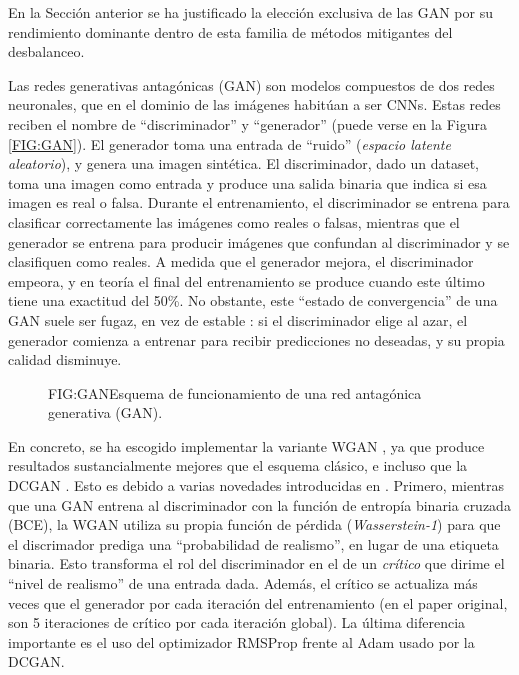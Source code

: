 En la Sección anterior se ha justificado la elección exclusiva de las GAN por su rendimiento dominante dentro de esta familia de métodos mitigantes del desbalanceo.


Las redes generativas antagónicas (GAN) son modelos compuestos de dos redes neuronales, que en el dominio de las imágenes habitúan a ser CNNs. Estas redes reciben el nombre de ``discriminador'' y ``generador'' (puede verse en la Figura \ref{FIG:GAN}). El generador toma una entrada de ``ruido'' (\textit{espacio latente aleatorio}), y genera una imagen sintética. El discriminador, dado un dataset, toma una imagen como entrada y produce una salida binaria que indica si esa imagen es real o falsa. Durante el entrenamiento, el discriminador se entrena para clasificar correctamente las imágenes como reales o falsas, mientras que el generador se entrena para producir imágenes que confundan al discriminador y se clasifiquen como reales. A medida que el generador mejora, el discriminador empeora, y en teoría el final del entrenamiento se produce cuando este último tiene una exactitud del 50\%. No obstante, este ``estado de convergencia'' de una GAN suele ser fugaz, en vez de estable \cite{GoogleGAN}: si el discriminador elige al azar, el generador comienza a entrenar para recibir predicciones no deseadas, y su propia calidad disminuye.

\begin{figure}[Esquema de la GAN]{FIG:GAN}{Esquema de funcionamiento de una red antagónica generativa (GAN).}
\end{figure}

En concreto, se ha escogido implementar la variante WGAN \cite{arjovsky2017wasserstein}, ya que produce resultados sustancialmente mejores que el esquema clásico, e incluso que la DCGAN \cite{nafi2020addressing}. Esto es debido a varias novedades introducidas en \citet{arjovsky2017wasserstein}. Primero, mientras que una GAN entrena al discriminador con la función de entropía binaria cruzada (BCE), la WGAN utiliza su propia función de pérdida (\textit{Wasserstein-1}) para que el discrimador prediga una ``probabilidad de realismo'', en lugar de una etiqueta binaria. Esto transforma el rol del discriminador en el de un \textit{crítico} que dirime el ``nivel de realismo'' de una entrada dada. Además, el crítico se actualiza más veces que el generador por cada iteración del entrenamiento (en el paper original, son 5 iteraciones de crítico por cada iteración global). La última diferencia importante es el uso del optimizador RMSProp frente al Adam usado por la DCGAN.

